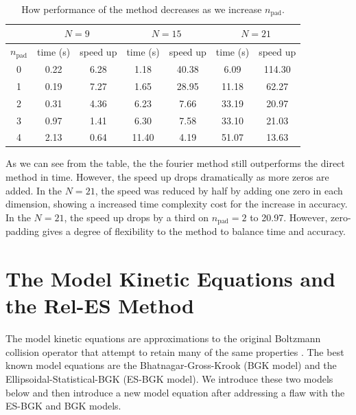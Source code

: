 \documentclass[12pt]{CSUNthesis}
\begin{document}
 \begin{table}[h]
  \begin{tabular}[c]{ c c c | c c | c c }
  \hline
  \multicolumn{1}{c}{} &
  \multicolumn{2}{c|}{$N = 9$} &
  \multicolumn{2}{c|}{$N = 15$} &
  \multicolumn{2}{c}{$N = 21$} \\
    \hline 
    $n_{\text{pad}}$ & time (s)  & speed up & time (s)  & speed up & time (s)  & speed up\\
    \hline
0 & 0.22 & 6.28 & 1.18 & 40.38 & 6.09 & 114.30\\ 
1 & 0.19 & 7.27 & 1.65 & 28.95 & 11.18 & 62.27\\ 
2 & 0.31 & 4.36 & 6.23 & 7.66 & 33.19 & 20.97\\ 
3 & 0.97 & 1.41 & 6.30 & 7.58 & 33.10 & 21.03\\ 
4 & 2.13 & 0.64 & 11.40 & 4.19 & 51.07 & 13.63\\ 
  
    \hline
  \end{tabular}
\caption{\label{tab:timing_padding_m155}  How performance of the method decreases as we increase $n_{\text{pad}}$.}
\end{table}

As we can see from the table, the the fourier method still outperforms the direct method in time. However, the speed up drops dramatically as more zeros are added. In the $N=21$, the speed was reduced by half by adding one zero in each dimension, showing a increased time complexity cost for the increase in accuracy. 
In the $N=21$, the speed up drops by a third on $n_{\text{pad}} = 2$ to 20.97. However, zero-padding gives a degree of flexibility to the method to balance time and accuracy.

\chapter{The Model Kinetic Equations and the Rel-ES Method}
\label{chap:kin}
The model kinetic equations are approximations to the original Boltzmann collision operator that attempt to retain many of the same properties \cite{Struchtrup2005}. The best known model equations are the Bhatnagar-Gross-Krook (BGK model) and the Ellipsoidal-Statistical-BGK (ES-BGK model). We introduce these two models below and then introduce a new model equation after addressing a flaw with the ES-BGK and BGK models.
\end{document}
